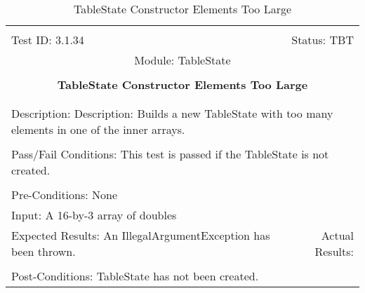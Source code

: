 \documentclass[titlepage]{article}
\begin{document}
\begin{center}%
\begin{table}
\begin{tabular}{|l r|}\hline&\\[-2mm]
	Test ID: 3.1.34	&Status: TBT\\[-3mm]
	\multicolumn{2}{|c|}{Module: TableState}\\&\\
	\multicolumn{2}{|c|}{\textbf{\large{TableState Constructor Elements Too Large}}}\\&\\\hline&\\[-3mm]
	\multicolumn{2}{|p{\textwidth}|}{Description: Description: Builds a new TableState with too many elements in one of the inner arrays.}\\[1mm]\hline&\\[-3mm]
	\multicolumn{2}{|p{\textwidth}|}{Pass/Fail Conditions: This test is passed if the TableState is not created.}\\[1mm]\hline&\\[-3mm]
	\multicolumn{2}{|p{\textwidth}|}{Pre-Conditions: None}\\[4mm]
	\multicolumn{2}{|p{\textwidth}|}{Input: A 16-by-3 array of doubles}\\[2mm]\hline
	\multicolumn{1}{|p{0.49\textwidth}}{Expected Results: An IllegalArgumentException has been thrown.}	&\multicolumn{1}{|p{0.45\textwidth}|}{Actual Results: }\\\hline&\\[-3mm]
	\multicolumn{2}{|p{\textwidth}|}{Post-Conditions: TableState has not been created.}\\\hline
\end{tabular}
\caption{TableState Constructor Elements Too Large}
\end{table}
\end{center}
\end{document}
